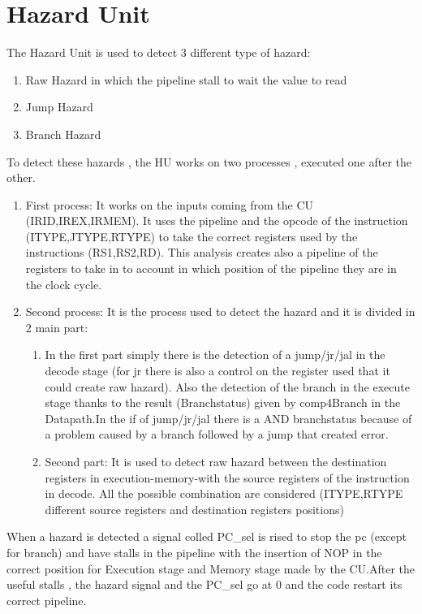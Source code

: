 \chapter{Hazard Unit}
\label{Hazard Unit}

The Hazard Unit is used to detect 3 different type of hazard: 
\begin{enumerate} 
    \item Raw Hazard in which the pipeline stall to wait the value to read
    \item Jump Hazard 
    \item Branch Hazard
\end{enumerate}

To detect these hazards , the HU works on two processes , executed one after the other.
\begin{enumerate} 
    \item First process: It works on the inputs coming from the CU (IRID,IREX,IRMEM). It uses the pipeline and the opcode of the instruction (ITYPE,JTYPE,RTYPE) to take the correct registers used by the instructions (RS1,RS2,RD).
    This analysis creates also a pipeline of the registers to take in to account in which position of the pipeline they are in the clock cycle.
    \item Second process: It is the process used to detect the hazard and it is divided in 2 main part:
    \begin{enumerate}  
        \item In the first part simply there is the detection of a jump/jr/jal in the decode stage (for jr there is also a control on the register used that it could create raw hazard).
              Also the detection of the branch in the execute stage thanks to the result (Branchstatus) given by comp4Branch in the Datapath.In the if of jump/jr/jal there is a AND branchstatus because of a problem
              caused by a branch followed by a jump that created error.
        \item Second part: It is used to detect raw hazard between the destination registers in execution-memory-with the source registers of the instruction in decode. All the possible combination are considered (ITYPE,RTYPE different source registers and destination registers positions)
    \end{enumerate}
\end{enumerate}

When a hazard is detected a signal colled PC_sel is rised to stop the pc (except for branch) and have stalls in the pipeline with the insertion of NOP in the correct position for Execution stage and Memory stage made by the CU.After the useful stalls , the hazard signal and the PC_sel go at 0 and the code restart its correct pipeline.